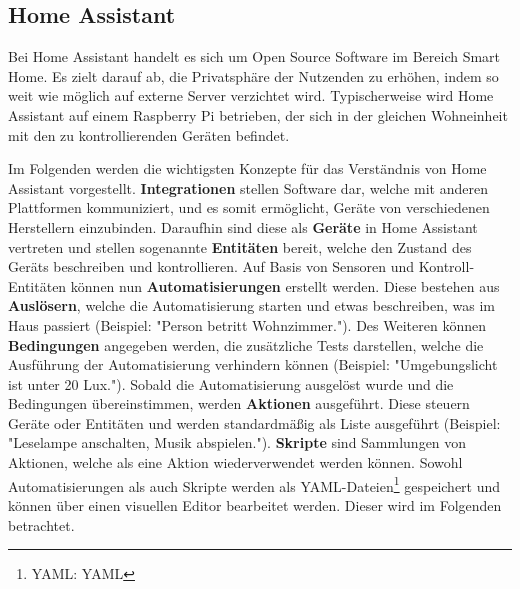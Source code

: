 \subsection{Home Assistant}

Bei Home Assistant handelt es sich um Open Source Software im Bereich Smart Home. Es zielt darauf ab, die Privatsphäre der Nutzenden zu erhöhen, indem so weit wie möglich auf externe Server verzichtet wird. Typischerweise wird Home Assistant auf einem Raspberry Pi betrieben, der sich in der gleichen Wohneinheit  mit den zu kontrollierenden Geräten befindet.
\parencite{homeassistantHomeAssistant}

Im Folgenden werden die wichtigsten Konzepte für das Verständnis von Home Assistant vorgestellt. \textbf{Integrationen} stellen Software dar, welche mit anderen Plattformen kommuniziert, und es somit ermöglicht, Geräte von verschiedenen Herstellern einzubinden. Daraufhin sind diese als \textbf{Geräte} in Home Assistant vertreten und stellen sogenannte \textbf{Entitäten} bereit, welche den Zustand des Geräts beschreiben und kontrollieren. Auf Basis von Sensoren und Kontroll-Entitäten können nun \textbf{Automatisierungen} erstellt werden. Diese bestehen aus \textbf{Auslösern}, welche die Automatisierung starten und etwas beschreiben, was im Haus passiert (Beispiel: "Person betritt Wohnzimmer."). Des Weiteren können \textbf{Bedingungen} angegeben werden, die zusätzliche Tests darstellen, welche die Ausführung der Automatisierung verhindern können (Beispiel: "Umgebungslicht ist unter 20 Lux."). Sobald die Automatisierung ausgelöst wurde und die Bedingungen übereinstimmen, werden \textbf{Aktionen} ausgeführt. Diese steuern Geräte oder Entitäten und werden standardmäßig als Liste ausgeführt (Beispiel: "Leselampe anschalten, Musik abspielen."). \textbf{Skripte} sind Sammlungen von Aktionen, welche als eine Aktion wiederverwendet werden können. \parencite{homeassistantConceptsTerminology} Sowohl Automatisierungen als auch Skripte werden als \acs{YAML}-Dateien\footnote{\acs{YAML}: \acl{YAML}} gespeichert und können über einen visuellen Editor bearbeitet werden. Dieser wird im Folgenden betrachtet.

